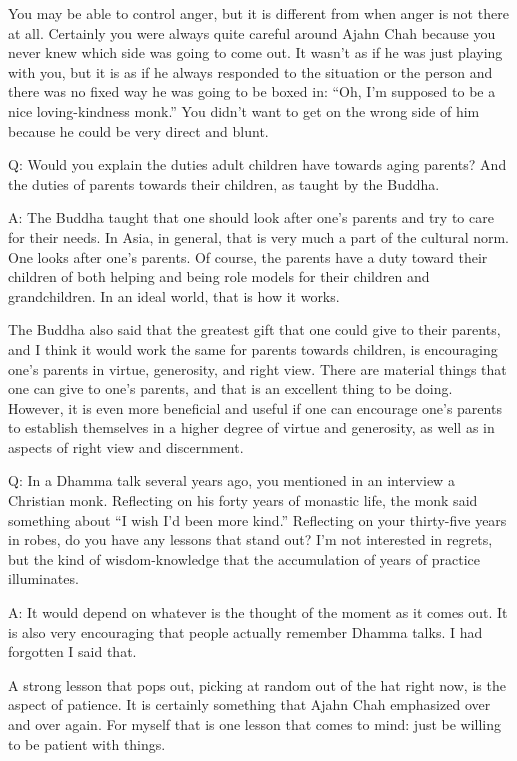 You may be able to control anger, but it is different from when anger is
not there at all. Certainly you were always quite careful around Ajahn
Chah because you never knew which side was going to come out. It wasn’t
as if he was just playing with you, but it is as if he always responded
to the situation or the person and there was no fixed way he was going
to be boxed in: “Oh, I’m supposed to be a nice loving-kindness monk.”
You didn’t want to get on the wrong side of him because he could be very
direct and blunt.

\qaspace
Q: Would you explain the duties adult children have towards aging
parents? And the duties of parents towards their children, as taught by
the Buddha.

\qaspace
A: The Buddha taught that one should look after one’s parents and try to
care for their needs. In Asia, in general, that is very much a part of
the cultural norm. One looks after one’s parents. Of course, the parents
have a duty toward their children of both helping and being role models
for their children and grandchildren. In an ideal world, that is how it
works.

The Buddha also said that the greatest gift that one could give to their
parents, and I think it would work the same for parents towards
children, is encouraging one’s parents in virtue, generosity, and right
view. There are material things that one can give to one’s parents, and
that is an excellent thing to be doing. However, it is even more
beneficial and useful if one can encourage one’s parents to establish
themselves in a higher degree of virtue and generosity, as well as in
aspects of right view and discernment.

\qaspace
Q: In a Dhamma talk several years ago, you mentioned in an interview a
Christian monk. Reflecting on his forty years of monastic life, the monk
said something about “I wish I’d been more kind.” Reflecting on your
thirty-five years in robes, do you have any lessons that stand out? I’m
not interested in regrets, but the kind of wisdom-knowledge that the
accumulation of years of practice illuminates.

\qaspace
A: It would depend on whatever is the thought of the moment as it comes
out. It is also very encouraging that people actually remember Dhamma
talks. I had forgotten I said that.

A strong lesson that pops out, picking at random out of the hat right
now, is the aspect of patience. It is certainly something that Ajahn
Chah emphasized over and over again. For myself that is one lesson that
comes to mind: just be willing to be patient with things.

